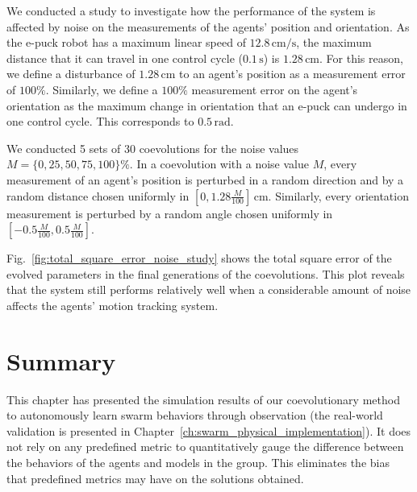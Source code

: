 We conducted a study to investigate how the performance of the system is affected by noise on the measurements of the agents' position and orientation. As the e-puck robot has a maximum linear speed of $12.8\,\textrm{cm/s}$, the maximum distance that it can travel in one control cycle ($0.1\,\textrm{s}$) is $1.28\,\textrm{cm}$. For this reason, we define a disturbance of $1.28\,\textrm{cm}$ to an agent's position as a measurement error of $100\%$. Similarly, we define a $100\%$ measurement error on the agent's orientation as the maximum change in orientation that an e-puck can undergo in one control cycle. This corresponds to $0.5\,\textrm{rad}$.

We conducted 5 sets of 30 coevolutions for the noise values $M=\{0, 25, 50, 75, 100\}\%$. In a coevolution with a noise value $M$, every measurement of an agent's position is perturbed in a random direction and by a random distance chosen uniformly in $\left[0, 1.28\frac{M}{100}\right] \,\textrm{cm}$. Similarly, every orientation measurement is perturbed by a random angle chosen uniformly in $\left[-0.5\frac{M}{100}, 0.5\frac{M}{100}\right]$.

Fig.~\ref{fig:total_square_error_noise_study} shows the total square error of the evolved parameters in the final generations of the coevolutions. This plot reveals that the system still performs relatively well when a considerable amount of noise affects the agents' motion tracking system.

\section{Summary}\label{sec:summary_simulation_swarm}

This chapter has presented the simulation results of our coevolutionary method to autonomously learn swarm behaviors through observation (the real-world validation is presented in Chapter~\ref{ch:swarm_physical_implementation}). It does not rely on any predefined metric to quantitatively gauge the difference between the behaviors of the agents and models in the group. This eliminates the bias that predefined metrics may have on the solutions obtained.

